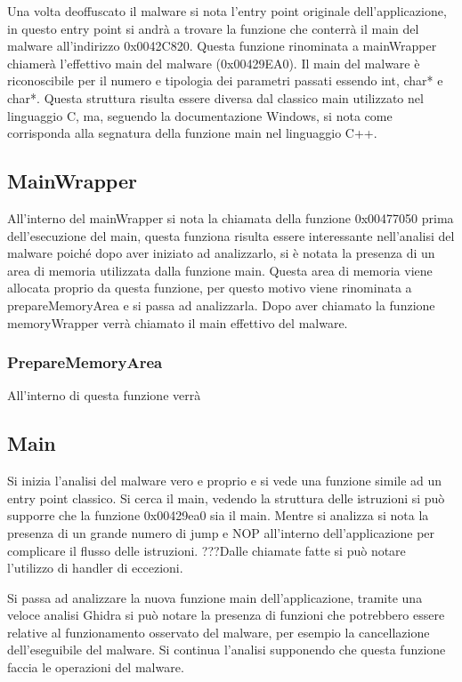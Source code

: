 \documentclass[]{article}
\begin{document}
Una volta deoffuscato il malware si nota l'entry point originale dell'applicazione, in questo entry point si andrà a trovare la funzione che conterrà il main del malware all'indirizzo 0x0042C820. Questa funzione rinominata a mainWrapper chiamerà l'effettivo main del malware (0x00429EA0). Il main del malware è riconoscibile per il numero e tipologia dei parametri passati essendo int, char* e char*.  Questa struttura risulta essere diversa dal classico main utilizzato nel linguaggio C, ma, seguendo la documentazione Windows, si nota come corrisponda alla segnatura della funzione main nel linguaggio C++. 

\subsection{MainWrapper}
All'interno del mainWrapper si nota la chiamata della funzione 0x00477050 prima dell'esecuzione del main, questa funziona risulta essere interessante nell'analisi del malware poiché dopo aver iniziato ad analizzarlo, si è notata la presenza di un area di memoria utilizzata dalla funzione main. Questa area di memoria viene allocata proprio da questa funzione, per questo motivo viene rinominata a prepareMemoryArea e si passa ad analizzarla. Dopo aver chiamato la funzione memoryWrapper verrà chiamato il main effettivo del malware.

\subsubsection{PrepareMemoryArea}
All'interno di questa funzione verrà 

\subsection{Main}

Si inizia l'analisi del malware vero e proprio e si vede una funzione simile ad un entry point classico. Si cerca il main, vedendo la struttura delle istruzioni si può supporre che la funzione 0x00429ea0 sia il main. 
Mentre si analizza si nota la presenza di un grande numero di jump e NOP all'interno dell'applicazione per complicare il flusso delle istruzioni.
???Dalle chiamate fatte si può notare l'utilizzo di handler di eccezioni.

Si passa ad analizzare la nuova funzione main dell'applicazione, tramite una veloce analisi Ghidra si può notare la presenza di funzioni che potrebbero essere relative al funzionamento osservato del malware, per esempio la cancellazione dell'eseguibile del malware. Si continua l'analisi supponendo che questa funzione faccia le operazioni del malware.
\end{document}
